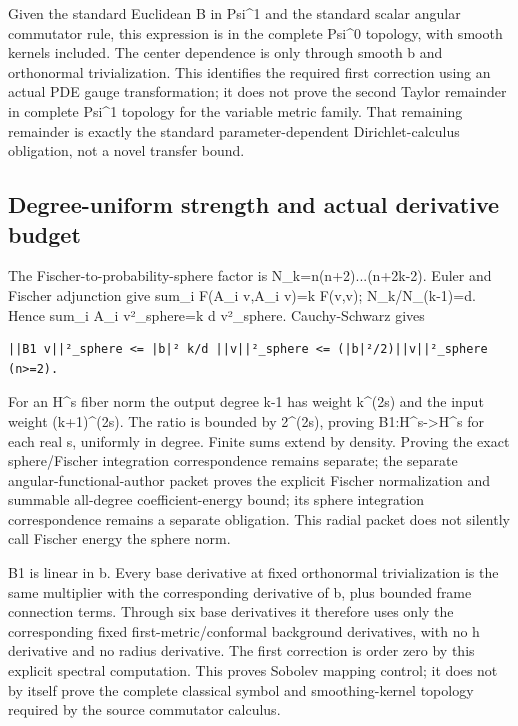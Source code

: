 \documentclass[11pt]{article}
\theoremstyle{definition}
\theoremstyle{remark}
\numberwithin{equation}{section}
\begin{document}
Given the standard Euclidean B in Psi\^{}1 and the standard scalar
angular commutator rule, this expression is in the complete Psi\^{}0
topology, with smooth kernels included. The center dependence is only
through smooth b and orthonormal trivialization. This identifies the
required first correction using an actual PDE gauge transformation; it
does not prove the second Taylor remainder in complete Psi\^{}1 topology
for the variable metric family. That remaining remainder is exactly the
standard parameter-dependent Dirichlet-calculus obligation, not a novel
transfer bound.

\hypertarget{source-bf1ada3d0e91-degree-uniform-strength-and-actual-derivative-budget}{%
\subsection{Degree-uniform strength and actual derivative
budget}\label{source-bf1ada3d0e91-degree-uniform-strength-and-actual-derivative-budget}}

The Fischer-to-probability-sphere factor is N\_k=n(n+2)...(n+2k-2).
Euler and Fischer adjunction give sum\_i F(A\_i v,A\_i v)=k F(v,v);
N\_k/N\_(k-1)=d. Hence sum\_i \textbar\textbar A\_i
v\textbar\textbar²\_sphere=k d
\textbar\textbar v\textbar\textbar²\_sphere. Cauchy-Schwarz gives

\begin{verbatim}
||B1 v||²_sphere <= |b|² k/d ||v||²_sphere <= (|b|²/2)||v||²_sphere  (n>=2).
\end{verbatim}

For an H\^{}s fiber norm the output degree k-1 has weight k\^{}(2s) and
the input weight (k+1)\^{}(2s). The ratio is bounded by
2\^{}(2\textbar s\textbar), proving B1:H\^{}s-\textgreater H\^{}s for
each real s, uniformly in degree. Finite sums extend by density. Proving
the exact sphere/Fischer integration correspondence remains separate;
the separate angular-functional-author packet proves the explicit
Fischer normalization and summable all-degree coefficient-energy bound;
its sphere integration correspondence remains a separate obligation.
This radial packet does not silently call Fischer energy the sphere
norm.

B1 is linear in b. Every base derivative at fixed orthonormal
trivialization is the same multiplier with the corresponding derivative
of b, plus bounded frame connection terms. Through six base derivatives
it therefore uses only the corresponding fixed first-metric/conformal
background derivatives, with no h derivative and no radius derivative.
The first correction is order zero by this explicit spectral
computation. This proves Sobolev mapping control; it does not by itself
prove the complete classical symbol and smoothing-kernel topology
required by the source commutator calculus.
\end{document}
